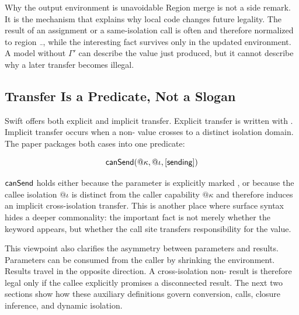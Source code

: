 \begin{propositionbox}{Why the output environment is unavoidable}
Region merge is not a side remark. It is the mechanism that explains why local code changes future legality. The result of an assignment or a same-isolation call is often  and therefore normalized to region $\mathunderscore$, while the interesting fact survives only in the updated environment. A model without $\Gamma'$ can describe the value just produced, but it cannot describe why a later transfer becomes illegal.
\end{propositionbox}

\subsection{Transfer Is a Predicate, Not a Slogan}

Swift offers both explicit and implicit transfer. Explicit transfer is written with . Implicit transfer occurs when a non- value crosses to a distinct isolation domain. The paper packages both cases into one predicate:

\[
  \textsf{canSend}(@\kappa, @\iota, [\textsf{sending}])
\]

$\textsf{canSend}$ holds either because the parameter is explicitly marked , or because the callee isolation $@\iota$ is distinct from the caller capability $@\kappa$ and therefore induces an implicit cross-isolation transfer. This is another place where surface syntax hides a deeper commonality: the important fact is not merely whether the keyword  appears, but whether the call site transfers responsibility for the value.

This viewpoint also clarifies the asymmetry between parameters and results. Parameters can be consumed from the caller by shrinking the environment. Results travel in the opposite direction. A cross-isolation non- result is therefore legal only if the callee explicitly promises a disconnected  result. The next two sections show how these auxiliary definitions govern conversion, calls, closure inference, and dynamic isolation.
